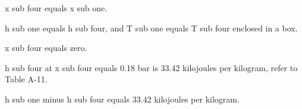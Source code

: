 x sub four equals x sub one.

h sub one equals h sub four, and T sub one equals T sub four enclosed in a box.

x sub four equals zero.

h sub four at x sub four equals 0.18 bar is 33.42 kilojoules per kilogram, refer to Table A-11.

h sub one minus h sub four equals 33.42 kilojoules per kilogram.